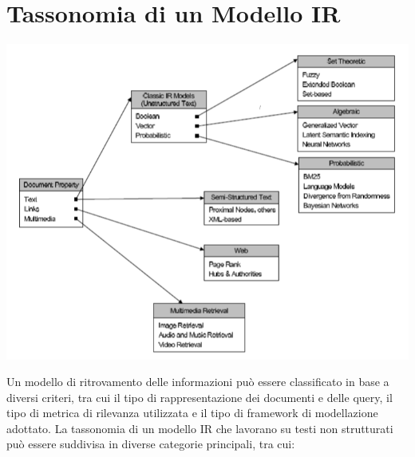 \documentclass{report}
\begin{document}
	\section{Tassonomia di un Modello IR}
	\begin{center}
		\includegraphics[scale=0.5]{assets/irtaxonomy.png}
	\end{center}
	Un modello di ritrovamento delle informazioni può essere classificato in base a diversi criteri, tra cui il tipo di rappresentazione dei documenti e delle query, il tipo di metrica di rilevanza utilizzata e il tipo di framework di modellazione adottato. La tassonomia di un modello IR che lavorano su testi non strutturati può essere suddivisa in diverse categorie principali, tra cui:
\end{document}
